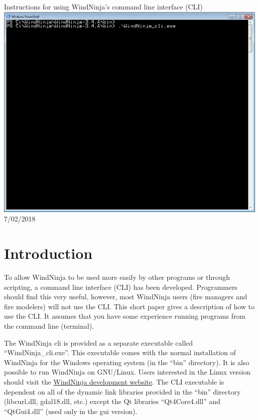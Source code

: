 \documentclass[12pt]{article}
\begin{document}
\begin{titlepage}
    \centering
    {\Huge
       Instructions for using WindNinja's command line interface (CLI)
    }    
    \vfill
    \includegraphics[scale=0.75]{cli-0}
    \vfill
  	{\Huge
	  7/02/2018 %
  	}
    \vfill
\end{titlepage}
\section*{Introduction}
To allow WindNinja to be used more easily by other programs or through scripting, a command line interface (CLI) has been developed.  Programmers should find this very useful, however, most WindNinja users (fire managers and fire modelers) will not use the CLI.  This short paper gives a description of how to use the CLI.  It assumes that you have some experience running programs from the command line (terminal).

The WindNinja cli is provided as a separate executable called “WindNinja\_cli.exe”.  This executable comes with the normal installation of WindNinja for the Windows operating system (in the “bin” directory).  It is also possible to run WindNinja on GNU/Linux.  Users interested in the Linux version should %
visit the \href{https://github.com/firelab/github}{WindNinja development website}. 
The CLI executable is dependent on all of the dynamic link libraries provided in the “bin” directory (libcurl.dll, gdal18.dll, etc.) except the Qt libraries “Qt4Core4.dll” and “QtGui4.dll” (used only in the gui version).
\end{document}
